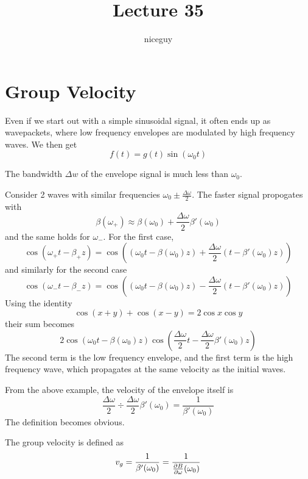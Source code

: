 \documentclass[12pt]{article}
\title{Lecture 35}
\author{niceguy}
\begin{document}
\maketitle

\section{Group Velocity}

Even if we start out with a simple sinusoidal signal, it often ends up as wavepackets, where low frequency envelopes are modulated by high frequency waves. We then get
$$f(t) = g(t)\sin(\omega_0t)$$

The bandwidth $\Delta w$ of the envelope signal is much less than $\omega_0$.

\begin{ex}
    Consider 2 waves with similar frequencies $\omega_0 \pm \frac{\Delta\omega}{2}$. The faster signal propogates with
    $$\beta(\omega_+) \approx \beta(\omega_0) + \frac{\Delta\omega}{2} \beta'(\omega_0)$$
    and the same holds for $\omega_-$. For the first case,
    $$\cos(\omega_+t - \beta_+z) = \cos\left((\omega_0t - \beta(\omega_0)z) + \frac{\Delta\omega}{2}(t - \beta'(\omega_0)z)\right)$$
    and similarly for the second case
    $$\cos(\omega_-t - \beta_-z) = \cos\left((\omega_0t - \beta(\omega_0)z) - \frac{\Delta\omega}{2}(t - \beta'(\omega_0)z)\right)$$
    Using the identity
    $$\cos(x+y) + \cos(x-y) = 2\cos x\cos y$$
    their sum becomes
    $$2\cos(\omega_0t - \beta(\omega_0)z)\cos\left(\frac{\Delta\omega}{2}t - \frac{\Delta\omega}{2}\beta'(\omega_0)z\right)$$
    The second term is the low frequency envelope, and the first term is the high frequency wave, which propagates at the same velocity as the initial waves.
\end{ex}

From the above example, the velocity of the envelope itself is
$$\frac{\Delta\omega}{2} \div \frac{\Delta\omega}{2}\beta'(\omega_0) = \frac{1}{\beta'(\omega_0)}$$
The definition becomes obvious.

\begin{defn}
    The group velocity is defined as
    $$v_g = \frac{1}{\beta'(\omega_0)} = \frac{1}{\frac{\partial B}{\partial \omega}(\omega_0)}$$
\end{defn}
\end{document}
